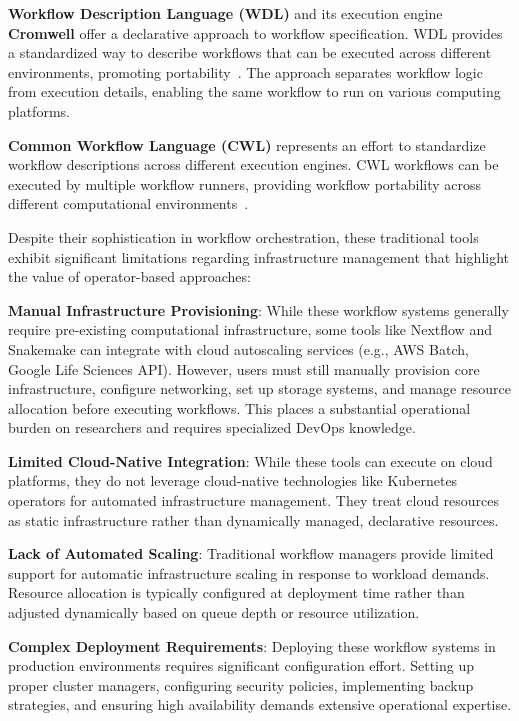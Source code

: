 \textbf{Workflow Description Language (WDL)} and its execution engine \textbf{Cromwell} offer a declarative approach to workflow specification.
WDL provides a standardized way to describe workflows that can be executed across different environments, promoting portability~\cite{wdl_cromwell}.
The approach separates workflow logic from execution details, enabling the same workflow to run on various computing platforms.

\textbf{Common Workflow Language (CWL)} represents an effort to standardize workflow descriptions across different execution engines.
CWL workflows can be executed by multiple workflow runners, providing workflow portability across different computational environments~\cite{cwl}.

Despite their sophistication in workflow orchestration, these traditional tools exhibit significant limitations regarding infrastructure management that highlight the value of operator-based approaches:

\textbf{Manual Infrastructure Provisioning}: While these workflow systems generally require pre-existing computational infrastructure, some tools like Nextflow and Snakemake can integrate with cloud autoscaling services (e.g., AWS Batch, Google Life Sciences API).
However, users must still manually provision core infrastructure, configure networking, set up storage systems, and manage resource allocation before executing workflows.
This places a substantial operational burden on researchers and requires specialized DevOps knowledge.

\textbf{Limited Cloud-Native Integration}: While these tools can execute on cloud platforms, they do not leverage cloud-native technologies like Kubernetes operators for automated infrastructure management.
They treat cloud resources as static infrastructure rather than dynamically managed, declarative resources.

\textbf{Lack of Automated Scaling}: Traditional workflow managers provide limited support for automatic infrastructure scaling in response to workload demands.
Resource allocation is typically configured at deployment time rather than adjusted dynamically based on queue depth or resource utilization.

\textbf{Complex Deployment Requirements}: Deploying these workflow systems in production environments requires significant configuration effort.
Setting up proper cluster managers, configuring security policies, implementing backup strategies, and ensuring high availability demands extensive operational expertise.

